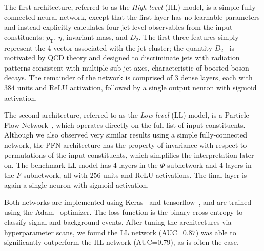\documentclass[reprint,nofootinbib,...]{revtex4-1}
\newcommand{\nconst}{64}       %
\newcommand{\HLLayers}{3}
\newcommand{\HLUnits}{384}
\newcommand{\HLAuc}{0.79}
\newcommand{\PfnPhiLayers}{4}
\newcommand{\PfnFLayers}{4}
\newcommand{\PfnUnits}{256}
\newcommand{\PfnAuc}{0.87}
\newcommand{\nlayerCLS}{3}     %
\newcommand{\nunitsCLS}{256} %
\newcommand{\pt}{p_\mathrm{T}} %
\begin{document}
The first architecture, referred to as the \textit{High-level} (HL) model, is a simple fully-connected neural network, except that the first layer has no learnable parameters and instead explicitly calculates four jet-level observables from the input constituents: $\pt$, $\eta$, invariant mass, and $D_2$.
The first three features simply represent the 4-vector associated with the jet cluster; the quantity $D_2$~\cite{Larkoski:2014gra} is motivated by QCD theory and designed to discriminate jets with radiation patterns consistent with multiple sub-jet axes, characteristic of boosted boson decays.
The remainder of the network is comprised of $\HLLayers$ dense layers, each with $\HLUnits$ units and ReLU activation, followed by a single output neuron with sigmoid activation.

The second architecture, referred to as the \textit{Low-level} (LL) model, is a Particle Flow Network~\cite{Komiske:2018cqr}, which operates directly on the full list of input constituents.
Although we also observed very similar results using a simple fully-connected network, the PFN architecture has the property of invariance with respect to permutations of the input constituents, which simplifies the interpretation later on.
The benchmark LL model has $\PfnPhiLayers$ layers in the $\Phi$ subnetwork and $\PfnFLayers$ layers in the $F$ subnetwork, all with $\PfnUnits$ units and ReLU activations.
The final layer is again a single neuron with sigmoid activation.

Both networks are implemented using Keras~\cite{keras} and tensorflow~\cite{tensorflow}, and are trained using the Adam~\cite{adam} optimizer.
The loss function is the binary cross-entropy to classify signal and background events.
After tuning the architectures via hyperparameter scans, we found the LL network (AUC=$\PfnAuc$) was able to significantly outperform the HL network (AUC=$\HLAuc$), as is often the case.


\end{document}
